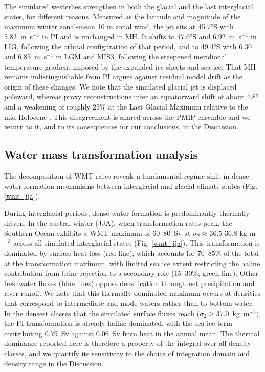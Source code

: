 \documentclass[pdflatex,sn-nature]{sn-jnl}
\begin{document}
The simulated westerlies strengthen in both the glacial and the last interglacial states, for different reasons. Measured as the latitude and magnitude of the maximum winter zonal-mean 10 m zonal wind, the jet sits at 45.7°S with 5.83~m~s$^{-1}$ in PI and is unchanged in MH. It shifts to 47.6°S and 6.92~m~s$^{-1}$ in LIG, following the orbital configuration of that period, and to 49.4°S with 6.30 and 6.85~m~s$^{-1}$ in LGM and MIS3, following the steepened meridional temperature gradient imposed by the expanded ice sheets and sea ice. That MH remains indistinguishable from PI argues against residual model drift as the origin of these changes. We note that the simulated glacial jet is displaced poleward, whereas proxy reconstructions infer an equatorward shift of about 4.8° and a weakening of roughly 25\% at the Last Glacial Maximum relative to the mid-Holocene \cite{Gray2023}. This disagreement is shared across the PMIP ensemble and we return to it, and to its consequences for our conclusions, in the Discussion.


\subsection{Water mass transformation analysis}


The decomposition of WMT rates reveals a fundamental regime shift in dense water formation mechanisms between interglacial and glacial climate states (Fig. \ref{wmt_jja}).

During interglacial periods, dense water formation is predominantly thermally driven. In the austral winter (JJA), when transformation rates peak, the Southern Ocean exhibits a WMT maximum of 60--80~Sv at $\sigma_2 \approx 36.5$-$36.8$ kg m$^{-3}$ across all simulated interglacial states (Fig. \ref{wmt_jja}). This transformation is dominated by surface heat loss (red line), which accounts for 70--85\% of the total at the transformation maximum, with limited sea ice extent restricting the haline contribution from brine rejection to a secondary role (15--30\%; green line). Other freshwater fluxes (blue lines) oppose densification through net precipitation and river runoff. We note that this thermally dominated maximum occurs at densities that correspond to intermediate and mode waters rather than to bottom water. In the densest classes that the simulated surface fluxes reach ($\sigma_2 \ge 37.0$~kg~m$^{-3}$), the PI transformation is already haline dominated, with the sea ice term contributing 0.79~Sv against 0.06~Sv from heat in the annual mean. The thermal dominance reported here is therefore a property of the integral over all density classes, and we quantify its sensitivity to the choice of integration domain and density range in the Discussion.
\end{document}
